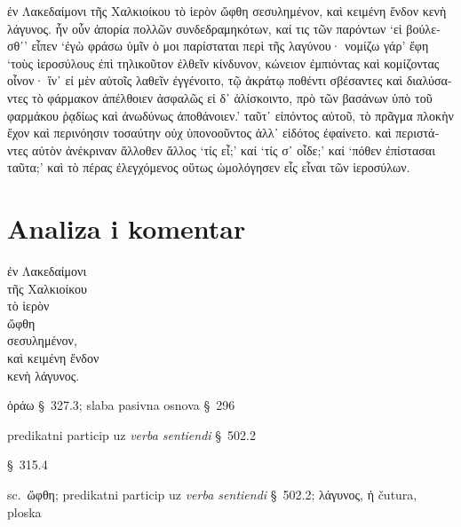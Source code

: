 {\large

\begin{greek}

\noindent ἐν Λακεδαίμονι τῆς Χαλκιοίκου τὸ ἱερὸν ὤφθη σεσυλημένον, καὶ κειμένη ἔνδον κενὴ λάγυνος. ἦν οὖν ἀπορία πολλῶν συνδεδραμηκότων, καί τις τῶν παρόντων `εἰ βούλεσθ᾽' εἶπεν `ἐγὼ φράσω ὑμῖν ὁ μοι παρίσταται περὶ τῆς λαγύνου· νομίζω γάρ' ἔφη `τοὺς ἱεροσύλους ἐπὶ τηλικοῦτον ἐλθεῖν κίνδυνον, κώνειον ἐμπιόντας καὶ κομίζοντας οἶνον· ἵν᾽ εἰ μὲν αὐτοῖς λαθεῖν ἐγγένοιτο, τῷ ἀκράτῳ ποθέντι σβέσαντες καὶ διαλύσαντες τὸ φάρμακον ἀπέλθοιεν ἀσφαλῶς εἰ δ᾽ ἁλίσκοιντο, πρὸ τῶν βασάνων ὑπὸ τοῦ φαρμάκου ῥᾳδίως καὶ ἀνωδύνως ἀποθάνοιεν.' ταῦτ᾽ εἰπόντος αὐτοῦ, τὸ πρᾶγμα πλοκὴν ἔχον καὶ περινόησιν τοσαύτην οὐχ ὑπονοοῦντος ἀλλ᾽ εἰδότος ἐφαίνετο. καὶ περιστάντες αὐτὸν ἀνέκριναν ἄλλοθεν ἄλλος `τίς εἶ;' καί `τίς σ᾽ οἶδε;' καί `πόθεν ἐπίστασαι ταῦτα;' καὶ τὸ πέρας ἐλεγχόμενος οὕτως ὡμολόγησεν εἷς εἶναι τῶν ἱεροσύλων.

\end{greek}

}


\section*{Analiza i komentar}


{\large
\begin{greek}
\noindent ἐν Λακεδαίμονι \\
\tabto{2em} τῆς Χαλκιοίκου \\
τὸ ἱερὸν \\
ὤφθη \\
σεσυλημένον, \\
καὶ κειμένη ἔνδον \\
κενὴ λάγυνος.\\
 
\end{greek}
}

\begin{description}[noitemsep]
\item[ὤφθη] ὁράω §~327.3; slaba pasivna osnova §~296
\item[σεσυλημένον] predikatni particip uz \textit{verba sentiendi} §~502.2
\item[κειμένη] §~315.4
\item[κειμένη\dots\ κενὴ λάγυνος] sc.\ ὤφθη; predikatni particip uz \textit{verba sentiendi} §~502.2; λάγυνος, ἡ čutura, ploska
\end{description}



